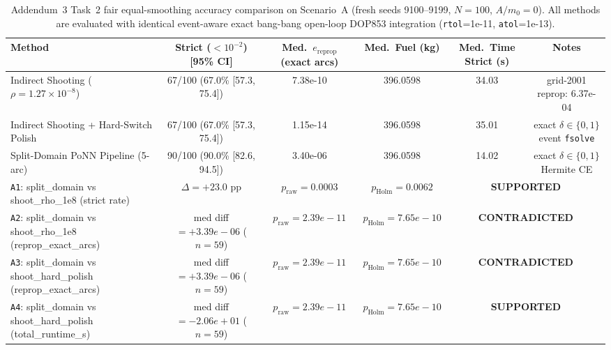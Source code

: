 \begin{table}[t]
\centering
\caption{Addendum~3 Task~2 fair equal-smoothing accuracy comparison on Scenario~A (fresh seeds 9100--9199, $N=100$, $A/m_0=0$). All methods are evaluated with identical event-aware exact bang-bang open-loop DOP853 integration (\texttt{rtol}=1e-11, \texttt{atol}=1e-13).}
\label{tab:addendum3_accuracy}
\begin{tabular}{lccccc}
\toprule
Method & Strict ($<10^{-2}$) [95\% CI] & Med.\ $e_{\mathrm{reprop}}$ (exact arcs) & Med.\ Fuel (kg) & Med.\ Time Strict (s) & Notes \\
\midrule
Indirect Shooting ($\rho=1.27\times 10^{-8}$) & 67/100 (67.0\% [57.3, 75.4]) & 7.38e-10 & 396.0598 & 34.03 & grid-2001 reprop: 6.37e-04 \\
Indirect Shooting + Hard-Switch Polish & 67/100 (67.0\% [57.3, 75.4]) & 1.15e-14 & 396.0598 & 35.01 & exact $\delta \in \{0,1\}$ event \texttt{fsolve} \\
Split-Domain PoNN Pipeline (5-arc) & 90/100 (90.0\% [82.6, 94.5]) & 3.40e-06 & 396.0598 & 14.02 & exact $\delta \in \{0,1\}$ Hermite CE \\
\midrule
\texttt{A1}: split\_domain vs shoot\_rho\_1e8 (strict rate) & $\Delta=+23.0$ pp & $p_{\mathrm{raw}}=0.0003$ & $p_{\mathrm{Holm}}=0.0062$ & \multicolumn{2}{c}{\textbf{SUPPORTED}} \\
\texttt{A2}: split\_domain vs shoot\_rho\_1e8 (reprop\_exact\_arcs) & med diff $= +3.39e-06$ ($n=59$) & $p_{\mathrm{raw}}=2.39e-11$ & $p_{\mathrm{Holm}}=7.65e-10$ & \multicolumn{2}{c}{\textbf{CONTRADICTED}} \\
\texttt{A3}: split\_domain vs shoot\_hard\_polish (reprop\_exact\_arcs) & med diff $= +3.39e-06$ ($n=59$) & $p_{\mathrm{raw}}=2.39e-11$ & $p_{\mathrm{Holm}}=7.65e-10$ & \multicolumn{2}{c}{\textbf{CONTRADICTED}} \\
\texttt{A4}: split\_domain vs shoot\_hard\_polish (total\_runtime\_s) & med diff $= -2.06e+01$ ($n=59$) & $p_{\mathrm{raw}}=2.39e-11$ & $p_{\mathrm{Holm}}=7.65e-10$ & \multicolumn{2}{c}{\textbf{SUPPORTED}} \\
\bottomrule
\end{tabular}
\end{table}
